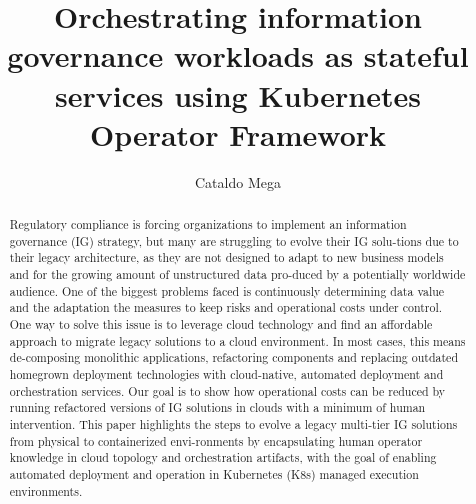 \documentclass[runningheads]{llncs}
\begin{document}
%
\title{Orchestrating information governance workloads as stateful services using Kubernetes Operator Framework}
%
%
\author{Cataldo Mega }
%
%
%  

\maketitle              %
%
\begin{abstract}
Regulatory compliance is forcing organizations to implement an information governance (IG) strategy, but many are struggling to evolve their IG solu-tions due to their legacy architecture, as they are not designed to adapt to new business models and for the growing amount of unstructured data pro-duced by a potentially worldwide audience. One of the biggest problems faced is continuously determining data value and the adaptation the measures to keep risks and operational costs under control. One way to solve this issue is to leverage cloud technology and find an affordable approach to migrate legacy solutions to a cloud environment. In most cases, this means de-composing monolithic applications, refactoring components and replacing outdated homegrown deployment technologies with cloud-native, automated deployment and orchestration services. Our goal is to show how operational costs can be reduced by running refactored versions of IG solutions in clouds with a minimum of human intervention. This paper highlights the steps to evolve a legacy multi-tier IG solutions from physical to containerized envi-ronments by encapsulating human operator knowledge in cloud topology and orchestration artifacts, with the goal of enabling automated deployment and operation in Kubernetes (K8s) managed execution environments.

\end{abstract}
%
%
%
\end{document}
